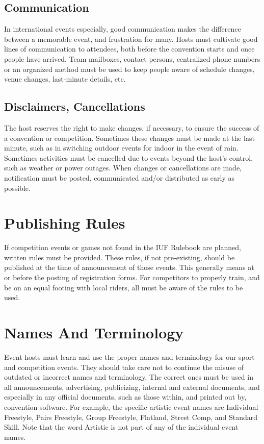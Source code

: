 \subsection{Communication}
In international events especially, good communication makes the difference between a memorable event, and frustration for many. 
Hosts must cultivate good lines of communication to attendees, both before the convention starts and once people have arrived. 
Team mailboxes, contact persons, centralized phone numbers or an organized method must be used to keep people aware of schedule changes, venue changes, last-minute details, etc.

\subsection{Disclaimers, Cancellations}
The host reserves the right to make changes, if necessary, to ensure the success of a convention or competition. 
Sometimes these changes must be made at the last minute, such as in switching outdoor events for indoor in the event of rain. 
Sometimes activities must be cancelled due to events beyond the host's control, such as weather or power outages. 
When changes or cancellations are made, notification must be posted, communicated and/or distributed as early as possible.

\section{Publishing Rules}
If competition events or games not found in the IUF Rulebook are planned, written rules must be provided. 
These rules, if not pre-existing, should be published at the time of announcement of those events. 
This generally means at or before the posting of registration forms. 
For competitors to properly train, and be on an equal footing with local riders, all must be aware of the rules to be used.

\section{Names And Terminology}
Event hosts must learn and use the proper names and terminology for our sport and competition events. 
They should take care not to continue the misuse of outdated or incorrect names and terminology. 
The correct ones must be used in all announcements, advertising, publicizing, internal and external documents, and especially in any official documents, such as those within, and printed out by, convention software. 
For example, the specific artistic event names are Individual Freestyle, Pairs Freestyle, Group Freestyle, Flatland, Street Comp, and Standard Skill. 
Note that the word Artistic is not part of any of the individual event names.

